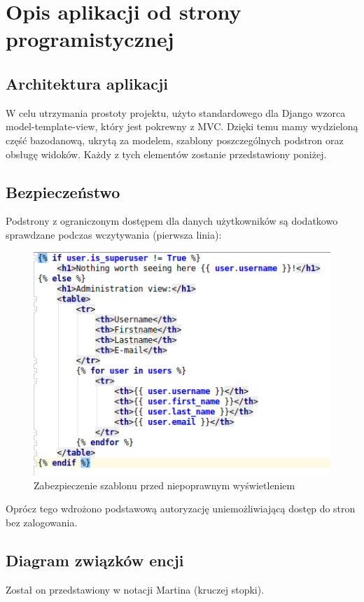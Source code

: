 \documentclass[12pt]{article}
\begin{document}
	\section{Opis aplikacji od strony programistycznej}
	\subsection{Architektura aplikacji}
	W celu utrzymania prostoty projektu, użyto standardowego dla Django wzorca model-template-view, który jest pokrewny z MVC. Dzięki temu mamy wydzieloną część bazodanową, ukrytą za modelem, szablony poszczególnych podstron oraz obsługę widoków. Każdy z tych elementów zostanie przedstawiony poniżej.
	
	\subsection{Bezpieczeństwo}
	Podstrony z ograniczonym dostępem dla danych użytkowników są dodatkowo sprawdzane podczas wczytywania (pierwsza linia):
	\begin{figure}[H]
		\centering
		\includegraphics[scale=0.7]{img/c_template_security.png}
		\caption{Zabezpieczenie szablonu przed niepoprawnym wyświetleniem}
	\end{figure}
	Oprócz tego wdrożono podstawową autoryzację uniemożliwiającą dostęp do stron bez zalogowania.
	
	\subsection{Diagram związków encji}
	Został on przedstawiony w notacji Martina (kruczej stopki).
	
\end{document}
